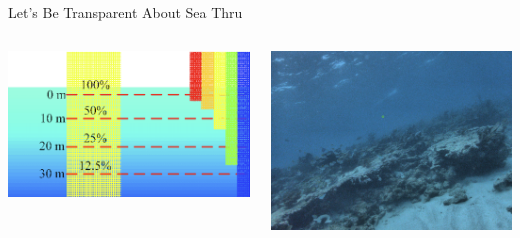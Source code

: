 \begin{frame}{Let's Be Transparent About Sea Thru}
    \begin{columns}
        \begin{column}{0.5\textwidth}
            \includegraphics[height=1.0\textheight,width=1.0\textwidth,keepaspectratio]{images/light.png}
        \end{column}
        \begin{column}{0.5\textwidth}
            \includegraphics[height=1.0\textheight,width=1.0\textwidth,keepaspectratio]{images/grainy.png}
        \end{column}
    \end{columns}
\end{frame}